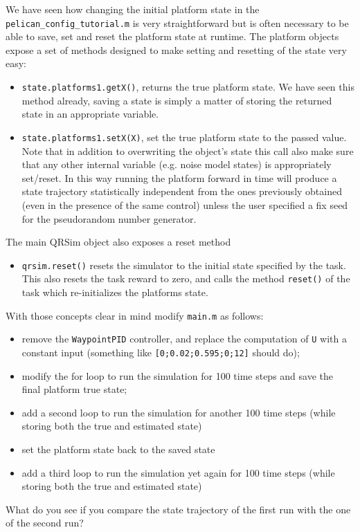 \documentclass[a4paper,11pt]{article}
\begin{document}
We have seen how changing the initial platform state in the \texttt{pelican\_config\_tutorial.m} is very straightforward but is often necessary to be able to save, set and reset the platform state at runtime.
The platform objects expose a set of methods designed to make setting and resetting of the state very easy:
\begin{itemize}
\item \texttt{state.platforms{1}.getX()}, returns the true platform state. We have seen this method already, saving a state is simply a matter of storing the returned state in an appropriate variable.
\item \texttt{state.platforms{1}.setX(X)}, set the true platform state to the passed value. Note that in addition to overwriting the object's state this call also make sure that any other internal variable (e.g. noise model states) is appropriately set/reset. In this way running the platform forward in time will produce a state trajectory statistically independent from the ones previously obtained (even in the presence of the same control) unless the user specified a fix seed for the pseudorandom number generator.
\end{itemize}

The main QRSim object also exposes a reset method 
\begin{itemize}
\item \texttt{qrsim.reset()} resets the simulator to the initial state specified by the task. This also resets the task reward to zero, and calls the method \texttt{reset()} of the task which re-initializes the platforms state. 
\end{itemize}

With those concepts clear in mind modify \texttt{main.m} as follows:
\begin{itemize}
\item remove the \texttt{WaypointPID} controller, and replace the computation of \texttt{U} with a constant input (something like \texttt{[0;0.02;0.595;0;12]} should do);
\item modify the for loop to run the simulation for 100 time steps and save the final platform true state;
\item add a second loop to run the simulation for another 100 time steps (while storing both the true and estimated state)
\item set the platform state back to the saved state
\item add a third loop to run the simulation yet again for 100 time steps (while storing both the true and estimated state)
\end{itemize}
What do you see if you compare the state trajectory of the first run with the one of the second run? 
\end{document}
